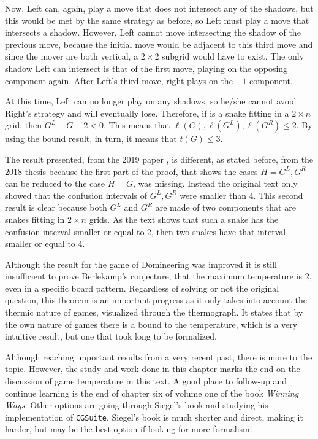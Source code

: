 Now, Left can, again, play a move that does not intersect any of the shadows, but this would be met by the same strategy as before, so Left must play a move that intersects a shadow. However, Left cannot move intersecting the shadow of the previous move, because the initial move would be adjacent to this third move and since the mover are both vertical, a $2\times 2$ subgrid would have to exist. The only shadow Left can intersect is that of the first move, playing on the opposing component again. After Left's third move, right plays on the $-1$ component.

At this time, Left can no longer play on any shadows, so he/she cannot avoid Right's strategy and will eventually lose. Therefore, if \Gm{} is a snake fitting in a $2\times n$ grid, then $G^L - G -2 < 0$. This means that $\ell(G),\ell(G^L),\ell(G^R) \leq 2$. By using the bound result, in turn, it means that $t(G) \leq 3$. 

The result presented, from the 2019 paper \cite{12}, is different, as stated before, from the 2018 thesis because the first part of the proof, that shows the cases $H=G^L,G^R$ can be reduced to the case $H=G$, was missing. Instead the original text only showed that the confusion intervals of $G^L,G^R$ were smaller than 4. This second result is clear because both $G^L$ and $G^R$ are made of two components that are snakes fitting in $2\times n$ grids. As the text shows that such a snake has the confusion interval smaller or equal to 2, then two snakes have that interval smaller or equal to 4.

Although the result for the game of Domineering was improved it is still insufficient to prove Berlekamp's conjecture, that the maximum temperature is $2$, even in a specific board pattern. Regardless of solving or not the original question, this theorem is an important progress as it only takes into account the thermic nature of games, visualized through the thermograph. It states that by the own nature of games there is a bound to the temperature, which is a very intuitive result, but one that took long to be formalized.

Although reaching important results from a very recent past, there is more to the topic. However, the study and work done in this chapter marks the end on the discussion of game temperature in this text. A good place to follow-up and continue learning is the end of chapter six of volume one of the book \textit{Winning Ways}. Other options are going through Siegel's book and studying his implementation of \texttt{CGSuite}. Siegel's book is much shorter and direct, making it harder, but may be the best option if looking for more formalism.












